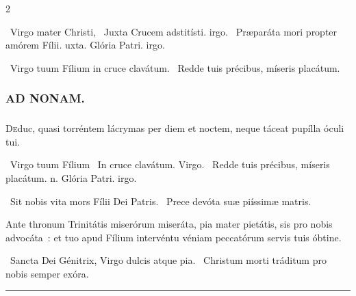 \documentclass[9pt,twoside]{extarticle}
\begin{document}
\begin{multicols}{2}
\begin{tightlist}{}
\item {}~Virgo mater Christi, \textred{*}~Juxta Crucem adstitísti. irgo. ~Præparáta mori propter amórem Fílii. uxta. Glória Patri. irgo.
\item {}~Virgo tuum Fílium in cruce clavátum. ~Redde tuis précibus, míseris placátum.
\end{tightlist}

\subsubsection*{\center \textsc{AD NONAM.}}
\subsubsection*{}
\lettrine{D}educ, quasi torréntem lácrymas per diem et noctem, neque táceat pupílla óculi tui.

\begin{tightlist}{}
\item {}~Virgo tuum Fílium \textred{*}~In cruce clavátum. Virgo. ~Redde tuis précibus, míseris placátum. n. Glória Patri. irgo.
\item {}~Sit nobis vita mors Fílii Dei Patris. ~Prece devóta suæ piíssimæ matris.
\item {}
\item {}
\item {} Ante thronum Trinitátis miserórum miseráta, pia mater pietátis, sis pro nobis advocáta~: et tuo apud Fílium intervéntu véniam peccatórum servis tuis óbtine.
\item {}~Sancta Dei Génitrix, Virgo dulcis atque pia. ~Christum morti tráditum pro nobis semper exóra.
\end{tightlist}

\begin{center}\textcolor{red}{\rule{\linewidth}{0.5pt}} \end{center}


\end{multicols}
\end{document}
